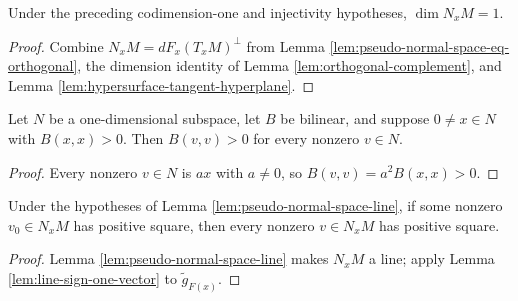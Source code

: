 \begin{lemma}
\label{lem:pseudo-normal-space-line}





Under the preceding codimension-one and injectivity hypotheses, $\dim N_xM=1$.
\end{lemma}
\begin{proof}

\sketch Combine $N_xM=dF_x(T_xM)^\perp$ from Lemma \ref{lem:pseudo-normal-space-eq-orthogonal}, the dimension identity of Lemma \ref{lem:orthogonal-complement}, and Lemma \ref{lem:hypersurface-tangent-hyperplane}.
\end{proof}

\begin{lemma}
\label{lem:line-sign-one-vector}




Let $N$ be a one-dimensional subspace, let $B$ be bilinear, and suppose $0\ne x\in N$ with $B(x,x)>0$. Then $B(v,v)>0$ for every nonzero $v\in N$.
\end{lemma}
\begin{proof}

\sketch Every nonzero $v\in N$ is $ax$ with $a\ne0$, so $B(v,v)=a^2B(x,x)>0$.
\end{proof}

\begin{lemma}
\label{lem:one-normal-decides-sign}





Under the hypotheses of Lemma \ref{lem:pseudo-normal-space-line}, if some nonzero $v_0\in N_xM$ has positive square, then every nonzero $v\in N_xM$ has positive square.
\end{lemma}
\begin{proof}

\sketch Lemma \ref{lem:pseudo-normal-space-line} makes $N_xM$ a line; apply Lemma \ref{lem:line-sign-one-vector} to $\widetilde g_{F(x)}$.
\end{proof}

